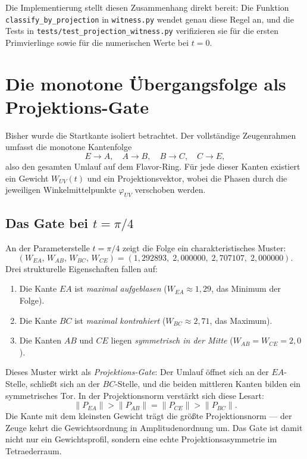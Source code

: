 \documentclass[11pt,a4paper]{article}
\theoremstyle{definition}
\theoremstyle{plain}
\begin{document}
	Die Implementierung stellt diesen Zusammenhang direkt bereit: Die Funktion \texttt{classify\_by\_projection} in \texttt{witness.py} wendet genau diese Regel an, und die Tests in \texttt{tests/test\_projection\_witness.py} verifizieren sie für die ersten Primvierlinge sowie für die numerischen Werte bei $t=0$.
	
	\section{Die monotone Übergangsfolge als Projektions-Gate}
	
	Bisher wurde die Startkante isoliert betrachtet. Der vollständige Zeugenrahmen umfasst die monotone Kantenfolge
	\[
	E\to A,\quad A\to B,\quad B\to C,\quad C\to E,
	\]
	also den gesamten Umlauf auf dem Flavor-Ring. Für jede dieser Kanten existiert ein Gewicht $W_{UV}(t)$ und ein Projektionsvektor, wobei die Phasen durch die jeweiligen Winkelmittelpunkte $\varphi_{UV}$ verschoben werden.
	
	\subsection{Das Gate bei $t=\pi/4$}
	
	An der Parameterstelle $t=\pi/4$ zeigt die Folge ein charakteristisches Muster:
	\[
	(W_{EA},\,W_{AB},\,W_{BC},\,W_{CE})
	=
	(1{,}292893,\;2{,}000000,\;2{,}707107,\;2{,}000000).
	\]
	Drei strukturelle Eigenschaften fallen auf:
	\begin{enumerate}[label=(\roman*)]
		\item Die Kante $EA$ ist \emph{maximal aufgeblasen} ($W_{EA}\approx 1{,}29$, das Minimum der Folge).
		\item Die Kante $BC$ ist \emph{maximal kontrahiert} ($W_{BC}\approx 2{,}71$, das Maximum).
		\item Die Kanten $AB$ und $CE$ liegen \emph{symmetrisch in der Mitte} ($W_{AB}=W_{CE}=2{,}0$).
	\end{enumerate}
	
	Dieses Muster wirkt als \emph{Projektions-Gate}: Der Umlauf öffnet sich an der $EA$-Stelle, schließt sich an der $BC$-Stelle, und die beiden mittleren Kanten bilden ein symmetrisches Tor. In der Projektionsnorm verstärkt sich diese Lesart:
	\[
	\|P_{EA}\|>\|P_{AB}\|=\|P_{CE}\|>\|P_{BC}\|.
	\]
	Die Kante mit dem kleinsten Gewicht trägt die größte Projektionsnorm --- der Zeuge kehrt die Gewichtsordnung in Amplitudenordnung um. Das Gate ist damit nicht nur ein Gewichtsprofil, sondern eine echte Projektionsasymmetrie im Tetraederraum.
	
\end{document}
